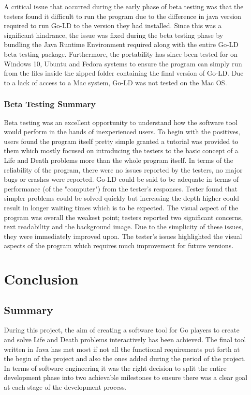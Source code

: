 \documentclass{l4proj}
\begin{document}
A critical issue that occurred during the early phase of beta testing was that the testers found it difficult to run the program due to the difference in java version required to run Go-LD to the version they had installed. Since this was a significant hindrance, the issue was fixed during the beta testing phase by bundling the Java Runtime Environment required along with the entire Go-LD beta testing package. Furthermore, the portability has since been tested for on Windows 10, Ubuntu and  Fedora systems to ensure the program can simply run from the files inside the zipped folder containing the final version of Go-LD. Due to a lack of access to a Mac system, Go-LD was not tested on the Mac OS.

\subsection{Beta Testing Summary}
Beta testing was an excellent opportunity to understand how the software tool would perform in the hands of inexperienced users. To begin with the positives, users found the program itself pretty simple granted a tutorial was provided to them which mostly focused on introducing the testers to the basic concept of a Life and Death problems more than the whole program itself. In terms of the reliability of the program, there were no issues reported by the testers, no major bugs or crashes were reported. Go-LD could be said to be adequate in terms of performance (of the "computer") from the tester’s responses. Tester found that simpler problems could be solved quickly but increasing the depth higher could result in longer waiting times which is to be expected. The visual aspect of the program was overall the weakest point; testers reported two significant concerns, text readability and the background image. Due to the simplicity of these issues, they were immediately improved upon. The tester’s issues highlighted the visual aspects of the program which requires much improvement for future versions.





\chapter{Conclusion}

\section{Summary}
During this project, the aim of creating a software tool for Go players to create and solve Life and Death problems interactively has been achieved. The final tool written in Java has met most if not all the functional requirements put forth at the begin of the project and also the ones added during the period of the project. In terms of software engineering it was the right decision to split the entire development phase into two achievable milestones to ensure there was a clear goal at each stage of the development process.
\end{document}

